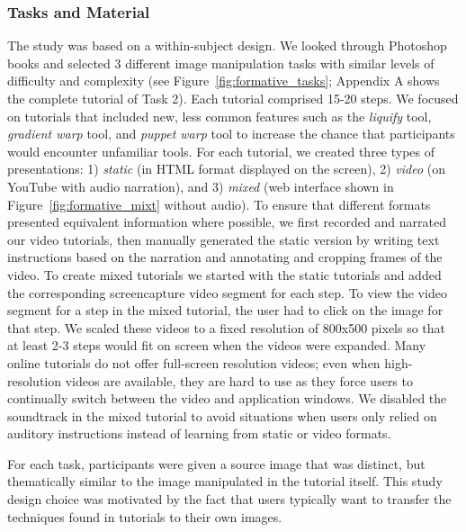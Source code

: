 \subsubsection{Tasks and Material}
The study was based on a within-subject design. We looked through Photoshop books and selected 3 different image manipulation tasks with similar levels of difficulty and complexity (see Figure~\ref{fig:formative_tasks}; Appendix A shows the complete tutorial of Task 2). Each tutorial comprised 15-20 steps. We focused on tutorials that included new, less common features such as the \emph{liquify} tool, \emph{gradient warp} tool, and \emph{puppet warp} tool to increase the chance that participants would encounter unfamiliar tools. For each tutorial, we created three types of presentations: 1) \emph{static} (in HTML format displayed on the screen), 2) \emph{video} (on YouTube with audio narration), and 3) \emph{mixed} (web interface shown in Figure~\ref{fig:formative_mixt} without audio). To ensure that different formats presented equivalent information where possible, we first recorded and narrated our video tutorials, then manually generated the static version by writing text instructions based on the narration and annotating and cropping frames of the video. To create mixed tutorials we started with the static tutorials and added the corresponding screencapture video segment for each step. To view the video segment for a step in the mixed tutorial, the user had to click on the image for that step. We scaled these videos to a fixed resolution of 800x500 pixels so that at least 2-3 steps would fit on screen when the videos were expanded. Many online tutorials do not offer full-screen resolution videos; even when high-resolution videos are available, they are hard to use as they force users to continually switch between the video and application windows. We disabled the soundtrack in the mixed tutorial to avoid situations when users only relied on auditory instructions instead of learning from static or video formats.

For each task, participants were given a source image that was distinct, but thematically similar to the image manipulated in the tutorial itself. This study design choice was motivated by the fact that users typically want to transfer the techniques found in tutorials to their own images.

